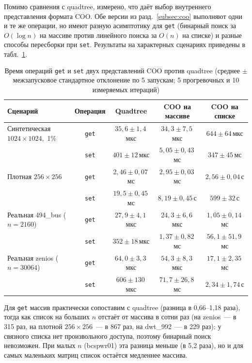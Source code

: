 \documentclass[a4paper]{article}
\begin{document}
Помимо сравнения с quadtree, измерено, что даёт выбор внутреннего представления формата COO. Обе версии из разд.~\ref{subsec:coo} выполняют одни и те же операции, но имеют разную асимптотику для \texttt{get} (бинарный поиск за $O(\log n)$ на массиве против линейного поиска за $O(n)$ на списке) и разные способы пересборки при \texttt{set}. Результаты на характерных сценариях приведены в табл.~\ref{tab:array_vs_list}.

\begin{table}[H]
    \centering
    \caption{Время операций \texttt{get} и \texttt{set} двух представлений COO против quadtree (среднее $\pm$ межзапусковое стандартное отклонение по 5 запускам; 5 прогревочных и 10 измеряемых итераций)}
    \label{tab:array_vs_list}
    \footnotesize
    \begin{tabular}{lcccc}
        \toprule
        Сценарий & Операция & Quadtree & COO на массиве & COO на списке \\
        \midrule
        Синтетическая $1024\times1024$,~1\% & \texttt{get} & $35{,}6 \pm 1{,}4$\,мкс & $34{,}3 \pm 7{,}5$\,мкс & $644 \pm 64$\,мкс \\
                                           & \texttt{set} & $401 \pm 12$\,мкс & $5{,}05 \pm 0{,}43$\,мс & $347 \pm 45$\,мс \\
        Плотная $256\times256$              & \texttt{get} & $2{,}46 \pm 0{,}07$\,мс & $2{,}95 \pm 0{,}03$\,мс & $2{,}56 \pm 0{,}04$\,с \\
                                           & \texttt{set} & $19{,}5 \pm 0{,}45$\,мс & $8{,}19 \pm 0{,}45$\,с & $599 \pm 32$\,с \\
        Реальная 494\_bus ($n=2160$)         & \texttt{get} & $27{,}9 \pm 4{,}1$\,мкс & $24{,}3 \pm 6{,}6$\,мкс & $1{,}05 \pm 0{,}14$\,мс \\
                                           & \texttt{set} & $352 \pm 18$\,мкс & $1{,}37 \pm 0{,}82$\,мс & $56{,}1 \pm 51{,}9$\,мс \\
        Реальная zenios ($n=30064$)         & \texttt{get} & $64{,}0 \pm 3{,}3$\,мкс & $54{,}3 \pm 8{,}3$\,мкс & $17{,}1 \pm 2{,}35$\,мс \\
                                           & \texttt{set} & $606 \pm 130$\,мкс & $71{,}7 \pm 26{,}8$\,мс & $2{,}34 \pm 1{,}74$\,с \\
        \bottomrule
    \end{tabular}
\end{table}

Для \texttt{get} массив практически сопоставим с quadtree (разница в 0,66--1,18 раза), тогда как список на больших $n$ отстаёт от массива в сотни раз (на zenios~--- в 315 раз, на плотной $256\times256$~--- в 867 раз, на dwt\_992~--- в 229 раз): у связного списка нет произвольного доступа, поэтому бинарный поиск невозможен. При малых $n$ (bcspwr01) эта разница меньше (в 5,2 раза), но и для самых маленьких матриц список остаётся медленнее массива.
\end{document}
